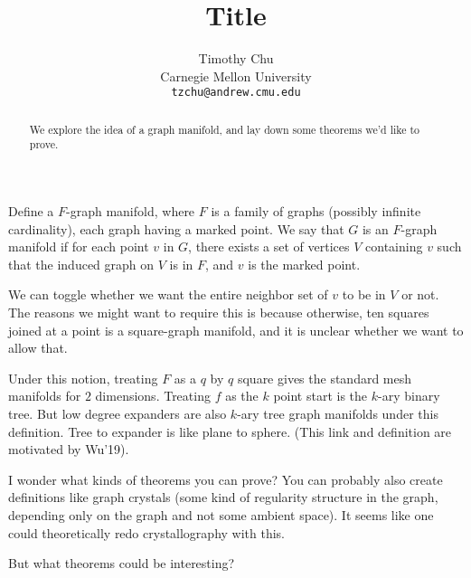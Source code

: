 


\title{Title}
\author{
  Timothy Chu \\
  Carnegie Mellon University\\
  \texttt{tzchu@andrew.cmu.edu}
}

\setcounter{page}{0}
\maketitle
\thispagestyle{empty}
\begin{abstract}
We explore the idea of a graph manifold, and lay down some theorems
we'd like to prove.
\end{abstract}
\clearpage
Define a $F$-graph manifold, where $F$ is a family of graphs (possibly
infinite cardinality), each graph having a marked point. We say that $G$ is an
$F$-graph manifold if for each point $v$ in $G$, there exists a set of
vertices $V$ containing $v$ such that the induced graph on $V$ is in
$F$, and $v$ is the marked point.

We can toggle whether we want the entire neighbor set of $v$ to be
in $V$ or not. The reasons we might want to require this is because
otherwise, ten squares joined at a point is a square-graph manifold,
and it is unclear whether we want to allow that.

Under this notion, treating $F$ as a $q$ by $q$ square gives the
standard mesh manifolds for $2$ dimensions. Treating $f$ as the $k$
point start is the $k$-ary binary tree. But low degree expanders are
also $k$-ary tree graph manifolds under this definition. Tree to
expander is like plane to sphere. (This link and definition are
motivated by Wu'19).

I wonder what kinds of theorems you can prove? You can probably also
create definitions like graph crystals (some kind of regularity
structure in the graph, depending only on the graph and not some
ambient space). It seems like one could theoretically redo
crystallography with this.

But what theorems could be interesting?



\begin{appendix}
\end{appendix}

